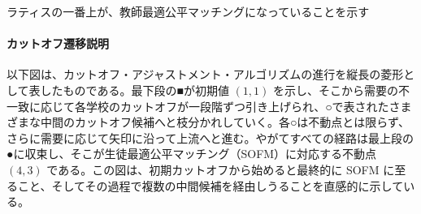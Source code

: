 \documentclass[12pt, a4paper]{article}
\theoremstyle{definition}
\theoremstyle{remark}
\theoremstyle{plain}
\begin{document}
ラティスの一番上が、教師最適公平マッチングになっていることを示す

\paragraph{カットオフ遷移説明}
以下図は、カットオフ・アジャストメント・アルゴリズムの進行を縦長の菱形として表したものである。最下段の■が初期値 $(1,1)$ を示し、そこから需要の不一致に応じて各学校のカットオフが一段階ずつ引き上げられ、○で表されたさまざまな中間のカットオフ候補へと枝分かれしていく。各○は不動点とは限らず、さらに需要に応じて矢印に沿って上流へと進む。やがてすべての経路は最上段の●に収束し、そこが生徒最適公平マッチング（SOFM）に対応する不動点 $(4,3)$ である。この図は、初期カットオフから始めると最終的に SOFM に至ること、そしてその過程で複数の中間候補を経由しうることを直感的に示している。
\end{document}
